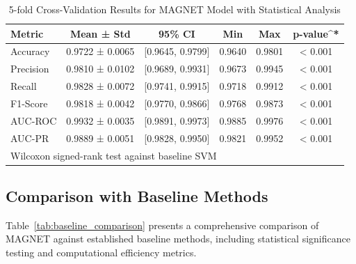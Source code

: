 \documentclass[a4paper,11pt]{article}
\begin{document}
\begin{table}[!htb]
  \centering
  \caption{5-fold Cross-Validation Results for MAGNET Model with Statistical Analysis}
  \label{tab:cross_validation}
  \begin{tabular}{@{}lccccc@{}}
    \toprule
    \textbf{Metric} & \textbf{Mean ± Std} & \textbf{95\% CI} & \textbf{Min} & \textbf{Max} & \textbf{p-value}^* \\
    \midrule
    Accuracy & 0.9722 ± 0.0065 & [0.9645, 0.9799] & 0.9640 & 0.9801 & < 0.001 \\
    Precision & 0.9810 ± 0.0102 & [0.9689, 0.9931] & 0.9673 & 0.9945 & < 0.001 \\
    Recall & 0.9828 ± 0.0072 & [0.9741, 0.9915] & 0.9718 & 0.9912 & < 0.001 \\
    F1-Score & 0.9818 ± 0.0042 & [0.9770, 0.9866] & 0.9768 & 0.9873 & < 0.001 \\
    AUC-ROC & 0.9932 ± 0.0035 & [0.9891, 0.9973] & 0.9885 & 0.9976 & < 0.001 \\
    AUC-PR & 0.9889 ± 0.0051 & [0.9828, 0.9950] & 0.9821 & 0.9952 & < 0.001 \\
    \bottomrule
    \multicolumn{6}{l}{\footnotesize *Wilcoxon signed-rank test against baseline SVM}
  \end{tabular}
\end{table}

\subsection{Comparison with Baseline Methods}
Table~\ref{tab:baseline_comparison} presents a comprehensive comparison of MAGNET against established baseline methods, including statistical significance testing and computational efficiency metrics.
\end{document}
